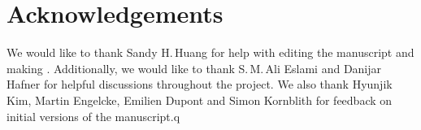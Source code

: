 \section{Acknowledgements}
We would like to thank Sandy H.\,Huang for help with editing the manuscript and making .
Additionally, we would like to thank S.\,M.\,Ali Eslami and Danijar Hafner for helpful discussions throughout the project. We also thank Hyunjik Kim, Martin Engelcke, Emilien Dupont and Simon Kornblith for feedback on initial versions of the manuscript.q
